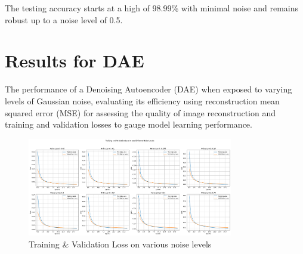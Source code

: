 The testing accuracy starts at a high of 98.99\% with minimal noise and remains robust up to a noise level of 0.5.



\section{Results for DAE}
The performance of a Denoising Autoencoder (DAE) when exposed to varying levels of Gaussian noise, evaluating its efficiency using reconstruction mean squared error (MSE) for assessing the quality of image reconstruction and training and validation losses to gauge model learning performance.

\begin{figure}[htbp]
  \centering
  \includegraphics[width=0.8\textwidth]{figures/dae_TVloss.png}
  \caption{Training \& Validation Loss on various noise levels}
  \label{fig:dae_tvloss}
\end{figure}


